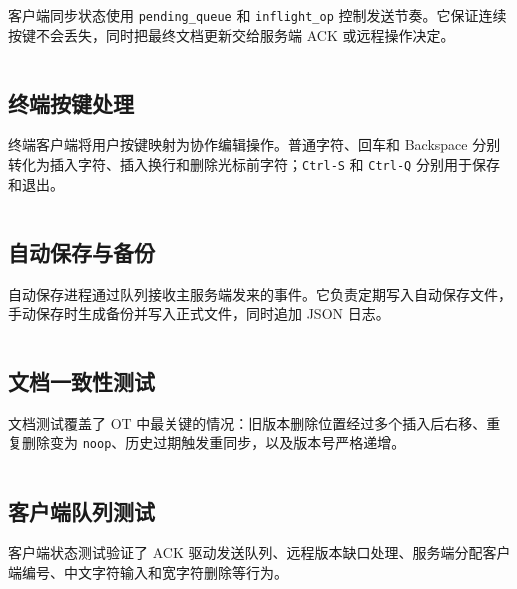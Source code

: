 客户端同步状态使用 \verb|pending_queue| 和 \verb|inflight_op| 控制发送节奏。它保证连续按键不会丢失，同时把最终文档更新交给服务端 ACK 或远程操作决定。

\inputminted[firstline=20,lastline=121]{python}{client_state.py}

\subsection{终端按键处理}

终端客户端将用户按键映射为协作编辑操作。普通字符、回车和 Backspace 分别转化为插入字符、插入换行和删除光标前字符；\verb|Ctrl-S| 和 \verb|Ctrl-Q| 分别用于保存和退出。

\inputminted[firstline=192,lastline=240]{python}{client.py}

\subsection{自动保存与备份}

自动保存进程通过队列接收主服务端发来的事件。它负责定期写入自动保存文件，手动保存时生成备份并写入正式文件，同时追加 JSON 日志。

\inputminted[firstline=15,lastline=102]{python}{autosave.py}

\subsection{文档一致性测试}

文档测试覆盖了 OT 中最关键的情况：旧版本删除位置经过多个插入后右移、重复删除变为 \verb|noop|、历史过期触发重同步，以及版本号严格递增。

\inputminted[firstline=7,lastline=102]{python}{tests/test_document.py}

\subsection{客户端队列测试}

客户端状态测试验证了 ACK 驱动发送队列、远程版本缺口处理、服务端分配客户端编号、中文字符输入和宽字符删除等行为。

\inputminted[firstline=9,lastline=98]{python}{tests/test_client_state.py}
